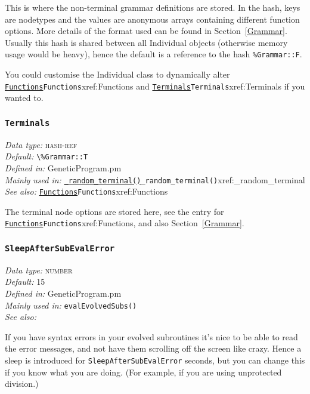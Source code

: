 \documentclass[a4paper]{article}
\begin{document}
This is where the non-terminal grammar definitions are stored.  In the
hash, keys are nodetypes and the values are anonymous arrays
containing different function options.  More details of the format
used can be found in Section~\ref{Grammar}.  Usually this hash is
shared between all Individual objects (otherwise memory usage would be
heavy), hence the default is a reference to the hash
\verb;%Grammar::F;.

You could customise the Individual class to dynamically alter
\hyperref[no]{\texttt{Functions}}{\texttt{Functions}}{xref:Functions} and \hyperref[no]{\texttt{Terminals}}{\texttt{Terminals}}{xref:Terminals} if you wanted to.

\subsubsection{\texttt{Terminals}}\label{xref:Terminals}
\begin{flushleft}
\textit{Data type:} \textsc{hash-ref}\\
\textit{Default:} \verb;\%Grammar::T;\\
\textit{Defined in:} GeneticProgram.pm\\
\textit{Mainly used in:} \hyperref[no]{\texttt{\_random\_terminal()}}{\texttt{\_random\_terminal()}}{xref:_random_terminal}\\
\textit{See also:} \hyperref[no]{\texttt{Functions}}{\texttt{Functions}}{xref:Functions}
\end{flushleft}

The terminal node options are stored here, see the entry for
\hyperref[no]{\texttt{Functions}}{\texttt{Functions}}{xref:Functions}, and also Section~\ref{Grammar}.


\subsubsection{\texttt{SleepAfterSubEvalError}}\label{xref:SleepAfterSubEvalError}
\begin{flushleft}
\textit{Data type:} \textsc{number}\\
\textit{Default:} 15\\
\textit{Defined in:} GeneticProgram.pm\\
\textit{Mainly used in:} \texttt{evalEvolvedSubs()}\\
\textit{See also:} 
\end{flushleft}

If you have syntax errors in your evolved subroutines it's
nice to be able to read the error messages, and not have
them scrolling off the screen like crazy.  Hence a sleep
is introduced for 
\texttt{SleepAfterSubEvalError} seconds, but you can
change this if you know what you are doing.  (For example,
if you are using unprotected division.)
\end{document}
